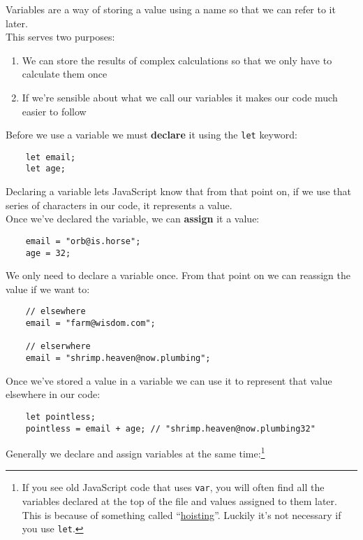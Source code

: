 Variables are a way of storing a value using a name so that we can refer to it later.
\\

This serves two purposes:

\begin{enumerate}
    \item We can store the results of complex calculations so that we only have to calculate them once
    \item If we're sensible about what we call our variables it makes our code much easier to follow
\end{enumerate}

Before we use a variable we must \textbf{declare} it using the \texttt{let} keyword:

\begin{verbatim}
    let email;
    let age;
\end{verbatim}

Declaring a variable lets JavaScript know that from that point on, if we use that series of characters in our code, it represents a value.
\\

Once we've declared the variable, we can \textbf{assign} it a value:

\begin{verbatim}
    email = "orb@is.horse";
    age = 32;
\end{verbatim}

\pagebreak

We only need to declare a variable once. From that point on we can reassign the value if we want to:

\begin{verbatim}
    // elsewhere
    email = "farm@wisdom.com";

    // elserwhere
    email = "shrimp.heaven@now.plumbing";
\end{verbatim}

Once we've stored a value in a variable we can use it to represent that value elsewhere in our code:

\begin{verbatim}
    let pointless;
    pointless = email + age; // "shrimp.heaven@now.plumbing32"
\end{verbatim}

Generally we declare and assign variables at the same time:\footnote{If you see old JavaScript code that uses \texttt{var}, you will often find all the variables declared at the top of the file and values assigned to them later. This is because of something called ``\href{https://scotch.io/tutorials/understanding-hoisting-in-javascript}{hoisting}''. Luckily it's not necessary if you use \texttt{let}.}

